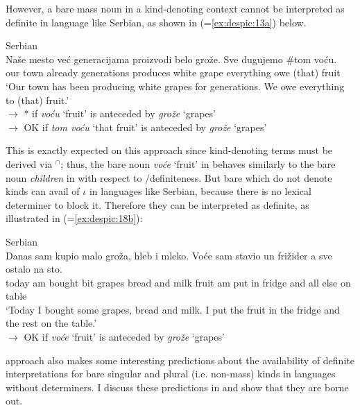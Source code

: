 \documentclass[output=paper,
modfonts
]{langscibook}
\begin{document}
	However, a bare mass noun in a kind-denoting context cannot be interpreted as definite in
	language like Serbian, as shown in  (=\ref{ex:despic:13a}) below. 
	
	\ea \label{ex:despic:33}
	Serbian \\
	\gll 
	{Na\v se} {mesto} {ve\'c} {generacijama} {proizvodi} {belo} {gro\v z\dj e}. {Sve} {dugujemo} {\textnormal{\#}{\op}tom{\cp}} {vo\'cu}. \\
	our town already generations produces white grape everything owe \phantom{\#}(that) fruit \\ 
	\glt `Our town has been producing white grapes for generations. We owe everything to (that) fruit.' \\
	$\rightarrow$ * if \textit{vo\'cu} `fruit' is anteceded by \textit{gro\v z\dj e} `grapes' \\
	$\rightarrow$ OK if \textit{tom vo\'cu} `that fruit' is anteceded by \textit{gro\v z\dj e} `grapes' 
	\z 
	
	This is exactly expected on this approach since kind-denoting terms must be derived via $^\cap$; thus, the bare noun \textit{vo\'ce} `fruit' in  behaves similarly to the bare noun \textit{children} in  with respect to /definiteness. But bare  which do not denote kinds can avail of $\iota$ in languages like Serbian, because there is no lexical determiner to block it. Therefore they can be interpreted as definite, as illustrated in  (=\ref{ex:despic:18b}):
	
	\ea \label{ex:despic:34}
	Serbian \\
	\gll 
	{Danas} {sam} {kupio} {malo} {gro\v z\dj a}, {hleb} {i} {mleko}. {Vo\'ce} {sam} {stavio} {un} {fri\v zider} {a} {sve} {ostalo} {na} {sto}. \\
	today am bought bit grapes bread and milk fruit am put in fridge and all else on table \\ 
	\glt `Today I bought some grapes, bread and milk. I put the fruit in the fridge and the rest on the table.' \\
	$\rightarrow$ OK if \textit{vo\'ce} `fruit' is anteceded by \textit{gro\v z\dj e} `grapes' 
	\z 
	
	 approach also makes some interesting predictions about the availability of definite interpretations for bare singular and plural (i.e. non-mass) kinds in languages without determiners. I discuss these predictions in  and show that they are borne out.
	
\end{document}
